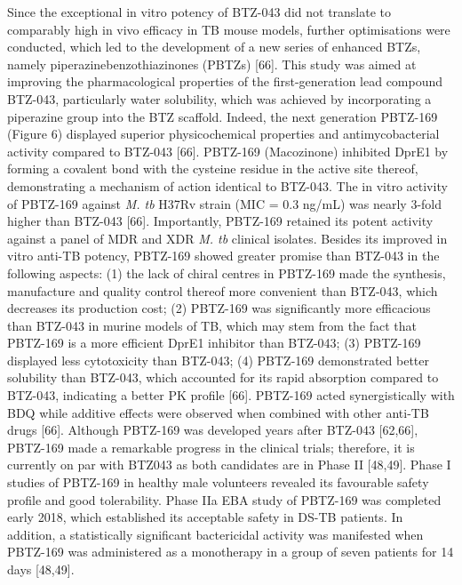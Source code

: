 \documentclass{article}
\begin{document}
Since the exceptional in vitro potency of BTZ-043 did not translate to comparably high in vivo efficacy in TB mouse models, further optimisations were conducted, which led to the development of a new series of enhanced BTZs, namely piperazinebenzothiazinones (PBTZs) [66]. This study was aimed at improving the pharmacological properties of the first-generation lead compound BTZ-043, particularly water solubility, which was achieved by incorporating a piperazine group into the BTZ scaffold. Indeed, the next generation PBTZ-169 (Figure 6) displayed superior physicochemical properties and antimycobacterial activity compared to BTZ-043 [66]. PBTZ-169 (Macozinone) inhibited DprE1 by forming a covalent bond with the cysteine residue in the active site thereof, demonstrating a mechanism of action identical to BTZ-043. The in vitro activity of PBTZ-169 against \textit{M. tb} H37Rv strain (MIC = 0.3 ng/mL) was nearly 3-fold higher than BTZ-043 [66]. Importantly, PBTZ-169 retained its potent activity against a panel of MDR and XDR \textit{M. tb} clinical isolates. Besides its improved in vitro anti-TB potency, PBTZ-169 showed greater promise than BTZ-043 in the following aspects: (1) the lack of chiral centres in PBTZ-169 made the synthesis, manufacture and quality control thereof more convenient than BTZ-043, which decreases its production cost; (2) PBTZ-169 was significantly more efficacious than BTZ-043 in murine models of TB, which may stem from the fact that PBTZ-169 is a more efficient DprE1 inhibitor than BTZ-043; (3) PBTZ-169 displayed less cytotoxicity than BTZ-043; (4) PBTZ-169 demonstrated better solubility than BTZ-043, which accounted for its rapid absorption compared to BTZ-043, indicating a better PK profile [66]. PBTZ-169 acted synergistically with BDQ while additive effects were observed when combined with other anti-TB drugs [66]. Although PBTZ-169 was developed years after BTZ-043 [62,66], PBTZ-169 made a remarkable progress in the clinical trials; therefore, it is currently on par with BTZ043 as both candidates are in Phase II [48,49]. Phase I studies of PBTZ-169 in healthy male volunteers revealed its favourable safety profile and good tolerability. Phase IIa EBA study of PBTZ-169 was completed early 2018, which established its acceptable safety in DS-TB patients. In addition, a statistically significant bactericidal activity was manifested when PBTZ-169 was administered as a monotherapy in a group of seven patients for 14 days [48,49].
\end{document}
